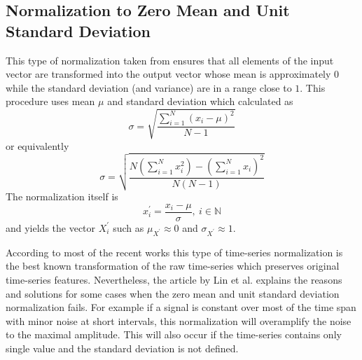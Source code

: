 \subsection{Normalization to Zero Mean and Unit Standard Deviation} \label{sect:normalization}
This type of normalization taken from \cite{citeulike:3815880} ensures that all elements of the input vector are transformed into the output vector whose mean is approximately $0$ while the standard deviation (and variance) are in a range close to $1$.
This procedure uses mean $\mu$ and standard deviation which calculated as 
\begin{equation}
\sigma = \sqrt{ \frac{ \sum_{i=1}^{N} (x_{i} - \mu)^{2} }{ N - 1 } }
\end{equation}
or equivalently
\begin{equation}
\sigma = \sqrt{ \frac{
                  N \left( \sum_{i=1}^{N} x_{i}^{2}  \right) - 
                  \left( \sum_{i=1}^{N} x_{i} \right) ^{2}
                }{
                  N(N-1)
                }  
          }
\end{equation}
The normalization itself is 
\begin{equation}
x_{i}^{'} = \frac{x_{i} - \mu}{\sigma}, \: i \in \mathbb{N}
\end{equation}
and yields the vector $X_{i}^{'}$ such as $\mu_{X^{'}} \approx 0$ and $\sigma_{X^{'}} \approx 1$.

According to most of the recent works \cite{citeulike:3815880} \cite{citeulike:2821475} \cite{citeulike:3978002} this type of time-series normalization is the best known transformation of the raw time-series which preserves original time-series features. Nevertheless, the article by Lin et al. \cite{citeulike:2821475} explains the reasons and solutions for some cases when the zero mean and unit standard deviation normalization fails. For example if a signal is constant over most of the time span with minor noise at short intervals, this normalization will overamplify the noise to the maximal amplitude. This will also occur if the time-series contains only single value and the standard deviation is not defined.